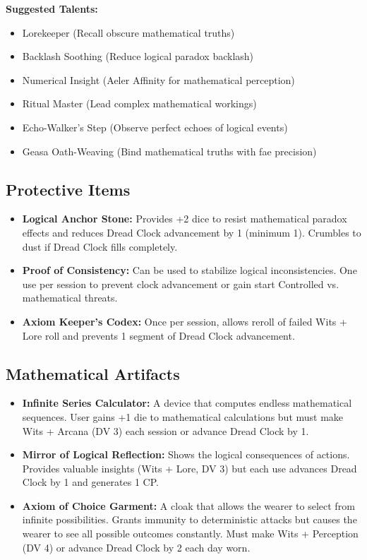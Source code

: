 \documentclass[11pt]{article}
\begin{document}
\textbf{Suggested Talents:}
\begin{itemize}
\item Lorekeeper (Recall obscure mathematical truths)
\item Backlash Soothing (Reduce logical paradox backlash)
\item Numerical Insight (Aeler Affinity for mathematical perception)
\item Ritual Master (Lead complex mathematical workings)
\item Echo-Walker's Step (Observe perfect echoes of logical events)
\item Geasa Oath-Weaving (Bind mathematical truths with fae precision)
\end{itemize}

\subsection{Protective Items}

\begin{itemize}
\item \textbf{Logical Anchor Stone:} Provides +2 dice to resist mathematical paradox effects and reduces Dread Clock advancement by 1 (minimum 1). Crumbles to dust if Dread Clock fills completely.
\item \textbf{Proof of Consistency:} Can be used to stabilize logical inconsistencies. One use per session to prevent clock advancement or gain start Controlled vs. mathematical threats.
\item \textbf{Axiom Keeper's Codex:} Once per session, allows reroll of failed Wits + Lore roll and prevents 1 segment of Dread Clock advancement.
\end{itemize}

\subsection{Mathematical Artifacts}

\begin{itemize}
\item \textbf{Infinite Series Calculator:} A device that computes endless mathematical sequences. User gains +1 die to mathematical calculations but must make Wits + Arcana (DV 3) each session or advance Dread Clock by 1.
\item \textbf{Mirror of Logical Reflection:} Shows the logical consequences of actions. Provides valuable insights (Wits + Lore, DV 3) but each use advances Dread Clock by 1 and generates 1 CP.
\item \textbf{Axiom of Choice Garment:} A cloak that allows the wearer to select from infinite possibilities. Grants immunity to deterministic attacks but causes the wearer to see all possible outcomes constantly. Must make Wits + Perception (DV 4) or advance Dread Clock by 2 each day worn.
\end{itemize}
\end{document}
